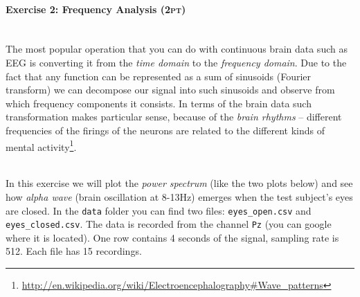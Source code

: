 \documentclass[a4paper,11pt]{article}
\newenvironment{exercise}[3]{\paragraph{Exercise #1: #2 \textsc{(#3pt)}}\ \\}{
\medskip}
\begin{document}
%
%
\begin{exercise}{2}{Frequency Analysis}{2}
The most popular operation that you can do with continuous brain data such as EEG is converting it from the \emph{time domain} to the \emph{frequency domain}. Due to the fact that any function can be represented as a sum of sinusoids (Fourier transform) we can decompose our signal into such sinusoids and observe from which frequency components it consists. In terms of the brain data such transformation makes particular sense, because of the \emph{brain rhythms} -- different frequencies of the firings of the neurons are related to the different kinds of mental activity\footnote{\url{http://en.wikipedia.org/wiki/Electroencephalography\#Wave_patterns}}.

\ \\
In this exercise we will plot the \emph{power spectrum} (like the two plots below) and see how \emph{alpha wave} (brain oscillation at 8-13Hz) emerges when the test subject's eyes are closed. In the \texttt{data} folder you can find two files: \texttt{eyes\_open.csv} and \texttt{eyes\_closed.csv}. The data is recorded from the channel \texttt{Pz} (you can google where it is located). One row contains 4 seconds of the signal, sampling rate is 512. Each file has 15 recordings.


\end{exercise}
\end{document}
